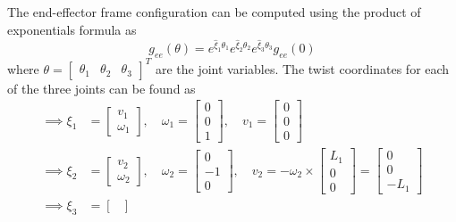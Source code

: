 The end-effector frame configuration can be computed using the product of exponentials formula as
\begin{equation}
    g_{e e}(\theta)
    =
    e^{\widehat{\xi}_{1} \theta_{1}}
    e^{\widehat{\xi}_{2} \theta_{2}}
    e^{\widehat{\xi}_{3} \theta_{3}}
    g_{e e}(0)
\end{equation}
where \( \theta = \begin{bmatrix} \theta_1 & \theta_2 & \theta_3 \end{bmatrix}^T \) are the joint variables.
The twist coordinates for each of the three joints can be found as
\begin{align*}
    \implies
    \xi_{1}
     & =
    \begin{bmatrix}
        v_1 \\
        \omega_1
    \end{bmatrix},
    \quad
    \omega_1
    =
    \begin{bmatrix}
        0 \\
        0 \\
        1
    \end{bmatrix},
    \quad
    v_1
    =
    \begin{bmatrix}
        0 \\
        0 \\
        0
    \end{bmatrix}
    \\
    \implies
    \xi_{2}
     & =
    \begin{bmatrix}
        v_2 \\
        \omega_2
    \end{bmatrix},
    \quad
    \omega_2
    =
    \begin{bmatrix}
        0  \\
        -1 \\
        0
    \end{bmatrix},
    \quad
    v_2
    =
    - \omega_2 \times
    \begin{bmatrix}
        L_1 \\
        0   \\
        0
    \end{bmatrix}
    =
    \begin{bmatrix}
        0 \\
        0 \\
        -L_1
    \end{bmatrix}
    \\
    \implies
    \xi_{3}
     & =
    \begin{bmatrix}

\end{bmatrix}
\end{align*}
